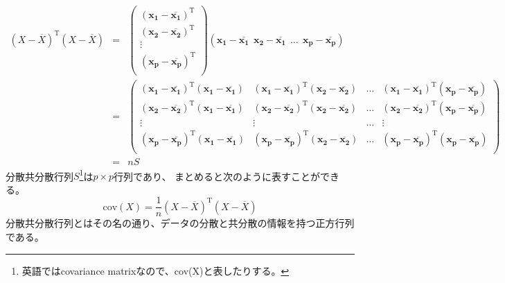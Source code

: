 \begin{eqnarray}
  (X-\overline{X})^\mathrm{T}(X-\overline{X}) &=& 
    \left(
  \begin{array}{c}
    (\bm{x_1}-\overline{\bm{x_1}})^\mathrm{T} \\
    (\bm{x_2}-\overline{\bm{x_2}})^\mathrm{T} \\
    \vdots \\
    (\bm{x_p}-\overline{\bm{x_p}})^\mathrm{T} \\
  \end{array}
  \right) 
  (\bm{x_1}-\overline{\bm{x_1}}~~\bm{x_2}-\overline{\bm{x_1}}~~\dots~~\bm{x_p-\overline{\bm{x_p}}})\\
  &=&
    \left(
  \begin{array}{cccc}
    (\bm{x_1}-\overline{\bm{x_1}})^\mathrm{T}(\bm{x_1}-\overline{\bm{x_1}}) & (\bm{x_1}-\overline{\bm{x_1}})^\mathrm{T}(\bm{x_2}-\overline{\bm{x_2}}) & \dots & (\bm{x_1}-\overline{\bm{x_1}})^\mathrm{T}(\bm{x_p}-\overline{\bm{x_p}}) \\
    (\bm{x_2}-\overline{\bm{x_2}})^\mathrm{T}(\bm{x_1}-\overline{\bm{x_1}}) & (\bm{x_2}-\overline{\bm{x_2}})^\mathrm{T}(\bm{x_2}-\overline{\bm{x_2}}) & \dots & (\bm{x_2}-\overline{\bm{x_2}})^\mathrm{T}(\bm{x_p}-\overline{\bm{x_p}}) \\
    \vdots    & \vdots    & \dots & \vdots    \\
    (\bm{x_p}-\overline{\bm{x_p}})^\mathrm{T}(\bm{x_1}-\overline{\bm{x_1}}) & (\bm{x_p}-\overline{\bm{x_p}})^\mathrm{T}(\bm{x_2}-\overline{\bm{x_2}}) & \dots & (\bm{x_p}-\overline{\bm{x_p}})^\mathrm{T}(\bm{x_p}-\overline{\bm{x_p}}) \\
  \end{array}
  \right) \\
  &=& nS
\end{eqnarray}
分散共分散行列$S$\footnote{英語ではcovariance matrixなので、cov(X)と表したりする。}は$p\times p$行列であり、
まとめると次のように表すことができる。
\begin{equation}
  \mathrm{cov}(X) = \frac{1}{n} \left( X-\overline{X} \right)^\mathrm{T} \left( X-\overline{X} \right)
\end{equation}
分散共分散行列とはその名の通り、データの分散と共分散の情報を持つ正方行列である。

